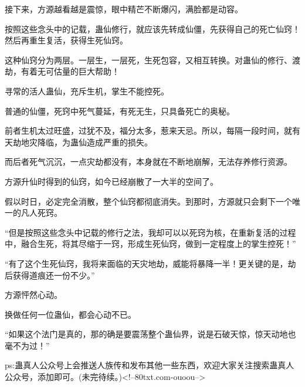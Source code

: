 \begin{this_body}
接下来，方源越看越是震惊，眼中精芒不断爆闪，满脸都是动容。

按照这些念头中的记载，蛊仙修行，就应该先转成仙僵，先获得自己的死亡仙窍！然后再重生复活，获得生死仙窍。

这种仙窍分为两层。一层生，一层死，生死包容，又相互转换。对蛊仙的修行、渡劫，有着无可估量的巨大帮助！

寻常的活人蛊仙，充斥生机，掌生不能控死。

普通的仙僵，死窍中死气蔓延，有死无生，只具备死亡的奥秘。

前者生机太过旺盛，过犹不及，福分太多，惹来天忌。所以，每隔一段时间，就有天劫地灾降临，为蛊仙造成严重的损失。

而后者死气沉沉，一点灾劫都没有，本身就在不断地崩解，无法存养修行资源。

方源升仙时得到的仙窍，如今已经崩散了一大半的空间了。

假以时日，必定完全消散，整个仙窍都彻底消失。到那时，方源就只会剩下一个唯一的凡人死窍。

“但是按照这些念头中记载的修行之法，我却可以以死窍为核，在重新复活的过程中，融合生死，将其尽缩于一窍，形成生死仙窍，做到一定程度上的掌生控死！”

“有了这个生死仙窍，我将来面临的天灾地劫，威能将暴降一半！更关键的是，劫后获得道痕还一份不少。”

方源怦然心动。

换做任何一位蛊仙，都会心动不已。

“如果这个法门是真的，那的确是要震荡整个蛊仙界，说是石破天惊，惊天动地也毫不为过！”

ps:蛊真人公众号上会推送人族传和发布其他一些东西，欢迎大家关注搜索蛊真人公众号，添加即可。(未完待续。)<!--80txt.com-ouoou-->

\end{this_body}

